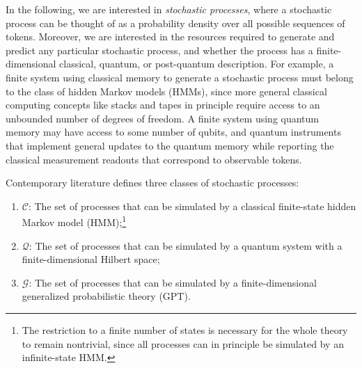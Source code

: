 \documentclass[prx,nofootinbib,onecolumn,showkeys,groupaddress,preprintnumbers,floatfix,
superscriptaddress]{revtex4-1}
\begin{document}
In the following, we are interested in 
\emph{stochastic processes}, where a stochastic process can be thought of as a probability density over all possible sequences of tokens.
Moreover, we are interested in the resources required to generate and predict any particular stochastic process, and whether the process has a 
finite-dimensional classical, quantum, or post-quantum description.
For example, a finite system using classical memory to generate a stochastic process must belong to the class of hidden Markov models (HMMs), since more general classical computing concepts like stacks and tapes in principle require access to an unbounded number of degrees of freedom.
A finite system using quantum memory may have access to some number of qubits, 
and quantum instruments that implement 
general updates to the quantum memory while reporting the classical measurement readouts that correspond to observable tokens.







Contemporary literature defines three classes of stochastic processes:
\begin{enumerate}
	\item
	$\mathcal{C}$: The set of processes that can be simulated by a 
    classical
    finite-state hidden Markov model (HMM);\footnote{The restriction to a finite number of states is necessary for the whole theory to remain nontrivial, since all processes can in principle be simulated by an infinite-state HMM.}
	\item
	$\mathcal{Q}$: The set of processes that can be simulated by a quantum system with a finite-dimensional Hilbert space;
	\item
	$\mathcal{G}$: The set of processes that can be simulated by a finite-dimensional generalized probabilistic theory (GPT).
\end{enumerate}	


\end{document}
